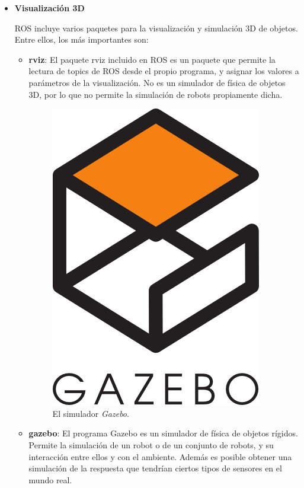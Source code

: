 \documentclass[12pt, a4paper]{report}
\begin{document}
\begin{itemize}
\begin{itemize}
\end{itemize}

\item \textbf{Visualización 3D}

ROS incluye varios paquetes para la visualización y simulación 3D de objetos. Entre ellos, los más importantes son:

\begin{itemize}

\item \textbf{rviz}: El paquete rviz incluido en ROS es un paquete que permite la lectura de topics de ROS desde el propio programa, y asignar los valores a parámetros de la visualización. No es un simulador de física de objetos 3D, por lo que no permite la simulación de robots propiamente dicha.

\begin{figure}[h]
  \begin{center}
    \includegraphics[scale=0.2]{../img/gazebo.png} 
  \end{center}
  \caption[El simulador Gazebo]{El simulador \textit{Gazebo}.}
  \label{fig: gazebo_logo}
\end{figure}

\item \textbf{gazebo}: El programa Gazebo es un simulador de física de objetos rígidos. Permite la simulación de un robot o de un conjunto de robots, y su interacción entre ellos y con el ambiente. Además es posible obtener una simulación de la respuesta que tendrían ciertos tipos de sensores en el mundo real.  


\end{itemize}
\end{itemize}
\end{document}
